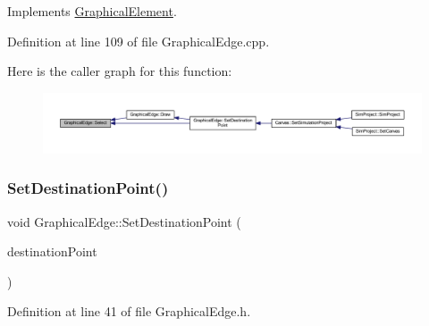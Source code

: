 Implements \hyperlink{class_graphical_element_a2627b34e57829f942aa00720d9cc8b46}{Graphical\+Element}.



Definition at line 109 of file Graphical\+Edge.\+cpp.

Here is the caller graph for this function\+:
\nopagebreak
\begin{figure}[H]
\begin{center}
\leavevmode
\includegraphics[width=350pt]{class_graphical_edge_aa2dbc33d5177ce3aad84f39ba97921de_icgraph}
\end{center}
\end{figure}
\mbox{\label{class_graphical_edge_af6eedeeadcd9abc368b1c0725617f5c9}} 
\subsubsection{\texorpdfstring{Set\+Destination\+Point()}{SetDestinationPoint()}}
{\footnotesize\ttfamily void Graphical\+Edge\+::\+Set\+Destination\+Point (\begin{DoxyParamCaption}\item[{wx\+Point2\+D\+Double}]{destination\+Point }\end{DoxyParamCaption})\hspace{0.3cm}{\ttfamily [inline]}}



Definition at line 41 of file Graphical\+Edge.\+h.

